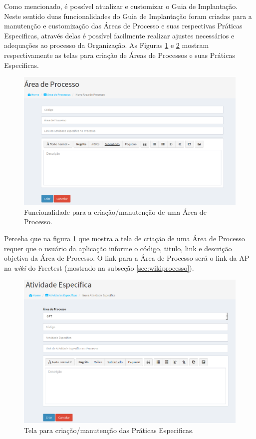 Como mencionado, é possível atualizar e customizar o Guia de Implantação. Neste sentido duas funcionalidades do Guia de Implantação foram criadas para a manutenção e customização das Áreas de Processo e suas respectivas Práticas Especificas, através delas é possível facilmente realizar ajustes necessários e adequações ao processo da Organização. As Figuras \ref{fig:fig69} e \ref{fig:fig610} mostram respectivamente as telas para criação de Áreas de Processos e suas Práticas Especificas.

\begin{figure}[H]
\centering
\includegraphics[width=.90\textwidth]{fig/figura69.png}
\caption{Funcionalidade para a criação/manutenção de uma Área de Processo.}
\label{fig:fig69}
\end{figure}

Perceba que na figura \ref{fig:fig69} que mostra a tela de criação de uma Área de Processo requer que o usuário da aplicação informe o código, titulo, link e descrição objetiva da Área de Processo. O link para a Área de Processo será o link da AP na \textit{wiki} do Freetest (mostrado na subseção \ref{sec:wikiprocesso}).

\begin{figure}[H]
\centering
\includegraphics[width=.90\textwidth]{fig/figura610.png}
\caption{Tela para criação/manutenção das Práticas Especificas.}
\label{fig:fig610}
\end{figure}

